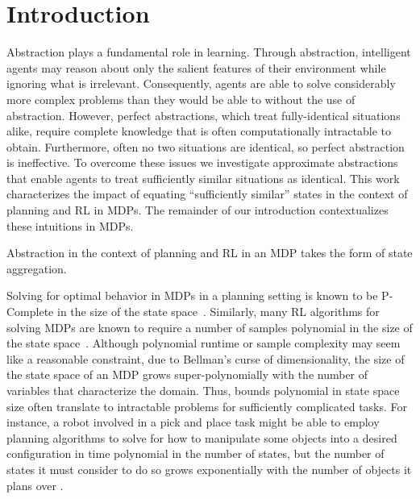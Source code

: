 \section{Introduction}
Abstraction plays a fundamental role in learning. Through abstraction, intelligent agents may reason about only the salient features of their environment while ignoring what is irrelevant. Consequently, agents are able to solve considerably more complex problems than they would be able to without the use of abstraction. However, perfect abstractions, which treat fully-identical situations alike, require complete knowledge that is often computationally intractable to obtain. Furthermore, often no two situations are identical, so perfect abstraction is ineffective. To overcome these issues we investigate approximate abstractions that enable agents to treat sufficiently similar situations as identical. This work characterizes the impact of equating ``sufficiently similar'' states in the context of planning and \ac{RL} in \acp{MDP}. The remainder of our introduction contextualizes these intuitions in \acp{MDP}.

Abstraction in the context of planning and \ac{RL} in an \ac{MDP} takes the form of state aggregation. 

Solving for optimal behavior in \acp{MDP} in a planning setting is known to be P-Complete in the size of the state space~\cite{papadimitriou1987complexity,littman1995complexity}. Similarly, many \ac{RL} algorithms for solving \acp{MDP} are known to require a number of samples polynomial in the size of the state space~\cite{strehl2009reinforcement}. Although polynomial runtime or sample complexity may seem like a reasonable constraint, due to Bellman's curse of dimensionality, the size of the state space of an \ac{MDP} grows super-polynomially with the number of variables that characterize the domain. Thus, bounds polynomial in state space size often translate to intractable problems for sufficiently complicated tasks.  For instance, a robot involved in a pick and place task might be able to employ planning algorithms to solve for how to manipulate some objects into a desired configuration in time polynomial in the number of states, but the number of states it must consider to do so grows exponentially with the number of objects it plans over .

